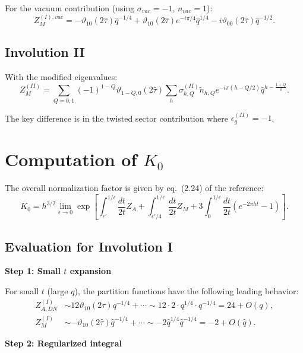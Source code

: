 \documentclass[11pt]{article}
\newcommand{\vt}{\vartheta}
\newcommand{\hq}{\hat{q}}
\newcommand{\htau}{\hat{\tau}}
\begin{document}
For the vacuum contribution (using $\sigma_{vac} = -1$, $n_{vac} = 1$):
\begin{equation}
Z_M^{(I), vac} = -\vt_{10}(2\htau) \hq^{-1/4} + \vt_{10}(2\htau) e^{-i\pi/4} \hq^{1/4} - i \vt_{00}(2\htau) \hq^{-1/2}.
\end{equation}

\subsection{Involution II}

With the modified eigenvalues:
\begin{equation}
Z_M^{(II)} = \sum_{Q=0,1} (-1)^{1-Q} \vt_{1-Q,0}(2\htau) \sum_h \sigma^{(II)}_{h,Q} \tilde{n}_{h,Q} e^{-i\pi(h-Q/2)} \hq^{h - \frac{1+Q}{4}}.
\end{equation}

The key difference is in the twisted sector contribution where $\epsilon_g^{(II)} = -1$.

\section{Computation of $K_0$}\label{app:K0}

The overall normalization factor is given by eq.~(2.24) of the reference:
\begin{equation}
K_0 = h^{3/2} \lim_{\epsilon \to 0} \exp\left[\int_{\epsilon'}^{1/\epsilon} \frac{dt}{2t} Z_A + \int_{\epsilon'/4}^{1/\epsilon} \frac{dt}{2t} Z_M + 3\int_0^{1/\epsilon} \frac{dt}{2t}(e^{-2\pi ht} - 1)\right].
\end{equation}

\subsection{Evaluation for Involution I}

\textbf{Step 1: Small $t$ expansion}

For small $t$ (large $q$), the partition functions have the following leading behavior:
\begin{align}
Z_{A,DN}^{(I)} &\sim 12 \vt_{10}(2\tau) q^{-1/4} + \cdots \sim 12 \cdot 2 \cdot q^{1/4} \cdot q^{-1/4} = 24 + O(q), \\
Z_M^{(I)} &\sim -\vt_{10}(2\htau) \hq^{-1/4} + \cdots \sim -2 \hq^{1/4} \hq^{-1/4} = -2 + O(\hq).
\end{align}

\textbf{Step 2: Regularized integral}
\end{document}
